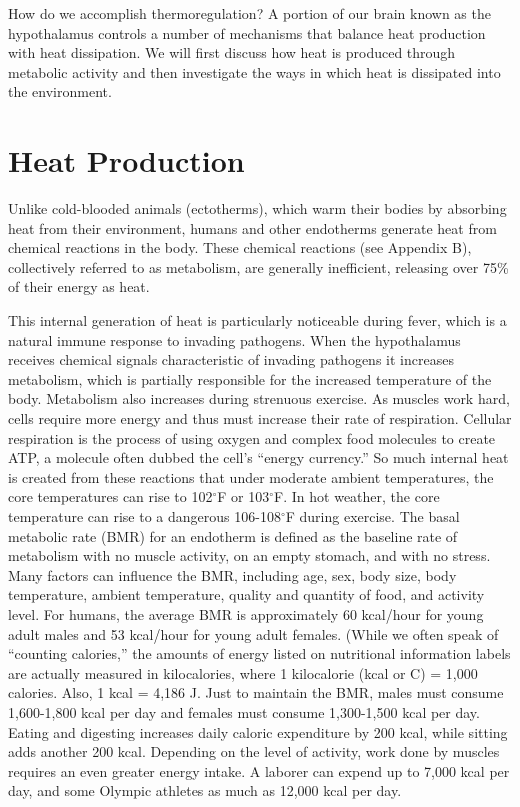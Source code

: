 How do we accomplish thermoregulation?  A portion of our brain known as the hypothalamus controls a number of mechanisms that balance heat production with heat dissipation.  We will first discuss how heat is produced through metabolic activity and then investigate the ways in which heat is dissipated into the environment.
  
\section{Heat Production}

Unlike cold-blooded animals (ectotherms), which warm their bodies by absorbing heat from their environment, humans and other endotherms generate heat from chemical reactions in the body.  These chemical reactions (see Appendix B), collectively referred to as metabolism, are generally inefficient, releasing over 75\% of their energy as heat.
 
This internal generation of heat is particularly noticeable during fever, which is a natural immune response to invading pathogens. When the hypothalamus receives chemical signals characteristic of invading pathogens it increases metabolism, which is partially responsible for the increased temperature of the body. Metabolism also increases during strenuous exercise.  As muscles work hard, cells require more energy and thus must increase their rate of respiration.  Cellular respiration is the process of using oxygen and complex food molecules to create ATP, a molecule often dubbed the cell’s ``energy currency.''  So much internal heat is created from these reactions that under moderate ambient temperatures, the core temperatures can rise to 102$^{\circ}$F or 103$^{\circ}$F.  In hot weather, the core temperature can rise to a dangerous 106-108$^{\circ}$F during exercise.
The basal metabolic rate (BMR) for an endotherm is defined as the baseline rate of metabolism with no muscle activity, on an empty stomach, and with no stress.  Many factors can influence the BMR, including age, sex, body size, body temperature, ambient temperature, quality and quantity of food, and activity level.  For humans, the average BMR is approximately 60 kcal/hour for young adult males and 53 kcal/hour for young adult females.  (While we often speak of “counting calories,” the amounts of energy listed on nutritional information labels are actually measured in kilocalories, where 1 kilocalorie (kcal or C) = 1,000 calories.  Also, 1 kcal = 4,186 J.  Just to maintain the BMR, males must consume 1,600-1,800 kcal per day and females must consume 1,300-1,500 kcal per day.  Eating and digesting increases daily caloric expenditure by 200 kcal, while sitting adds another 200 kcal.  Depending on the level of activity, work done by muscles requires an even greater energy intake.  A laborer can expend up to 7,000 kcal per day, and some Olympic athletes as much as 12,000 kcal per day.

